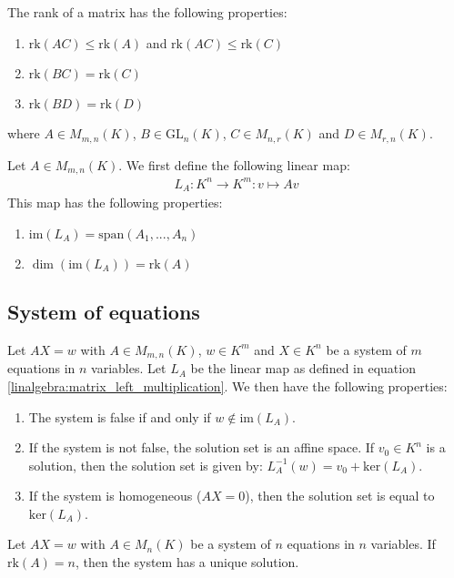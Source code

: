 	\begin{property}\label{linalgebra:rank_properties}
	        The rank of a matrix has the following properties:
        	\begin{enumerate}
			\item $\text{rk}(AC)\leq\text{rk}(A)$ and $\text{rk}(AC)\leq\text{rk}(C)$
        		\item $\text{rk}(BC)=\text{rk}(C)$
		        \item $\text{rk}(BD)=\text{rk}(D)$
		\end{enumerate}
		where $A\in M_{m,n}(K)$, $B\in\text{GL}_n(K)$, $C\in M_{n,r}(K)$ and $D\in M_{r,n}(K)$.
	\end{property}
	\begin{property}\label{linalgebra:dim_matrix_left_multiplication}
	        Let $A\in M_{m,n}(K)$. We first define the following linear map:
        	\begin{gather}
			\label{linalgebra:matrix_left_multiplication}
        		L_A:K^n\rightarrow K^m:v\mapsto Av
		\end{gather}
	        This map has the following properties:
        	\begin{enumerate}
        		\item $\text{im}(L_A) = \text{span}(A_1, ..., A_n)$
			\item $\dim(\text{im}(L_A))=\text{rk}(A)$
		\end{enumerate}
	\end{property}

\subsection{System of equations}

	\begin{property}\label{linalgebra:matrix_and_equations}
	        Let $AX=w$ with $A\in M_{m,n}(K)$, $w\in K^m$ and $X\in K^n$ be a system of $m$ equations in $n$ variables. Let $L_A$ be the linear map as defined in equation \ref{linalgebra:matrix_left_multiplication}. We then have the following properties:
        	\begin{enumerate}
			\item The system is false if and only if $w\not\in\text{im}(L_A)$.
        		\item If the system is not false, the solution set is an affine space. If $v_0\in K^n$ is a solution, then the solution set is given by: $L_A^{-1}(w)=v_0+\text{ker}(L_A)$.
		        \item If the system is homogeneous ($AX=0$), then the solution set is equal to $\text{ker}(L_A)$.
		\end{enumerate}
	\end{property}
	\begin{property}[Uniqueness]\label{linalgebra:rank_unique_solution}
	        Let $AX=w$ with $A\in M_n(K)$ be a system of $n$ equations in $n$ variables. If $\text{rk}(A)=n$, then the system has a unique solution.
	\end{property}

